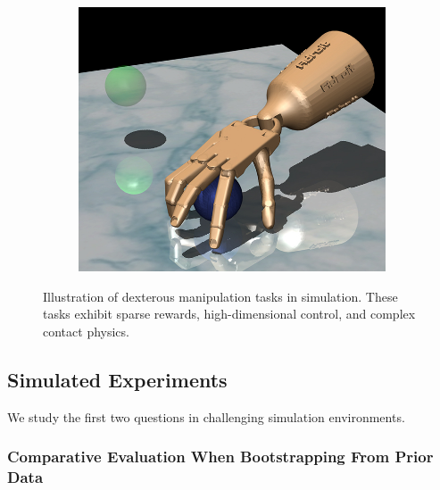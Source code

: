 \begin{figure}[tpb]
\begin{subfigure}[b]{0.3\textwidth}
        \center
        \includegraphics[height=0.8\linewidth]{awac/figures/imgs/relocate.jpg}
    \end{subfigure}
    \caption{Illustration of dexterous manipulation tasks in simulation. These tasks exhibit sparse rewards, high-dimensional control, and complex contact physics. }
\end{figure}

\subsection{Simulated Experiments}
We study the first two questions in challenging simulation  environments. 

\subsubsection{Comparative Evaluation When Bootstrapping From Prior Data} \label{sec:dextrous_exps}

